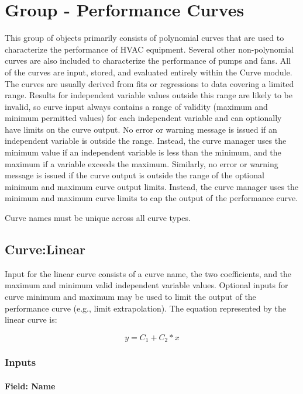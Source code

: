 \section{Group - Performance Curves}\label{group---performance-curves}

This group of objects primarily consists of polynomial curves that are used to characterize the performance of HVAC equipment. Several other non-polynomial curves are also included to characterize the performance of pumps and fans. All of the curves are input, stored, and evaluated entirely within the Curve module. The curves are usually derived from fits or regressions to data covering a limited range. Results for independent variable values outside this range are likely to be invalid, so curve input always contains a range of validity (maximum and minimum permitted values) for each independent variable and can optionally have limits on the curve output. No error or warning message is issued if an independent variable is outside the range. Instead, the curve manager uses the minimum value if an independent variable is less than the minimum, and the maximum if a variable exceeds the maximum. Similarly, no error or warning message is issued if the curve output is outside the range of the optional minimum and maximum curve output limits. Instead, the curve manager uses the minimum and maximum curve limits to cap the output of the performance curve.

Curve names must be unique across all curve types.

\subsection{Curve:Linear}\label{curvelinear}

Input for the linear curve consists of a curve name, the two coefficients, and the maximum and minimum valid independent variable values. Optional inputs for curve minimum and maximum may be used to limit the output of the performance curve (e.g., limit extrapolation). The equation represented by the linear curve is:

\begin{equation}
y = {C_1} + {C_2}*x
\end{equation}

\subsubsection{Inputs}\label{inputs-031}

\paragraph{Field: Name}\label{field-name-030}

